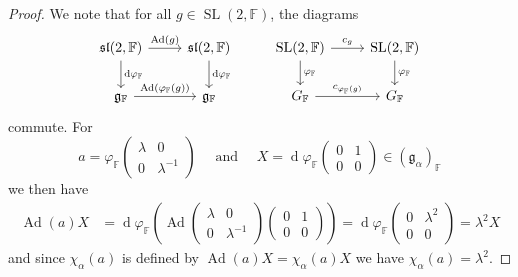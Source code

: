 \documentclass[12pt]{amsart}
\newcommand{\F}{\mathbb{F} }
\newcommand{\frakg}{\mathfrak{g}}
\numberwithin{equation}{section}
\theoremstyle{remark} %
\begin{document}
\begin{proof}
	We note that for all $g \in \operatorname{SL}(2,\F)$, the diagrams 
	$$
	\begin{tikzcd}
		{\mathfrak{sl}(2,\mathbb{F})} \arrow[r, "\operatorname{Ad}(g)"] \arrow[d, "\operatorname{d}\!\varphi_\F"] & {\mathfrak{sl}(2,\mathbb{F})} \arrow[d, "\operatorname{d}\!\varphi_\F"] &   {\operatorname{SL}(2,\mathbb{F})} \arrow[d, "\varphi_\F"] \arrow[r, "c_g"] & {\operatorname{SL}(2,\mathbb{F})} \arrow[d, "\varphi_\F"] \\
		\mathfrak{g}_{\mathbb{F}} \arrow[r, "\operatorname{Ad}(\varphi_\F(g))"]                                   & \mathfrak{g}_{\mathbb{F}}                                              & G_{\mathbb{F}} \arrow[r, "c_{\varphi_\F(g)}"]                              & G_{\mathbb{F}}                                        
	\end{tikzcd}
	$$
	commute. For
	$$
	a = \varphi_\F \begin{pmatrix}
		\lambda & 0 \\ 0 & \lambda^{-1}
	\end{pmatrix} \quad \text{ and } \quad X = \operatorname{d}\! \varphi_\F \begin{pmatrix}
	0 & 1 \\ 0 &0 
	\end{pmatrix} \in (\frakg_{\alpha})_\F
	$$
	we then have
	\begin{align*}
		\operatorname{Ad}\left(a \right) X &= \operatorname{d}\!\varphi_\F \left(\operatorname{Ad}\begin{pmatrix}
		\lambda & 0 \\ 0 & \lambda^{-1}
		\end{pmatrix} \begin{pmatrix}
		0 & 1 \\ 0 & 0
		\end{pmatrix}
		\right) = \operatorname{d}\!\varphi_\F \begin{pmatrix}
			0 & \lambda^{2} \\ 0 & 0
		\end{pmatrix} = \lambda^2 X
	\end{align*}
	and since $\chi_\alpha(a)$ is defined by $\operatorname{Ad}(a)X = \chi_{\alpha}(a)X$ we have $\chi_\alpha(a) = \lambda^{2}$.
\end{proof}
\end{document}
